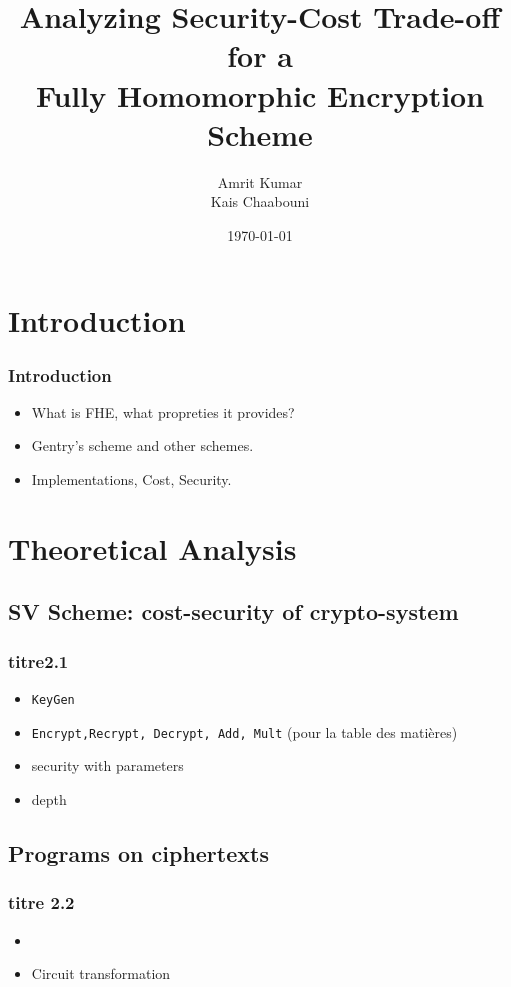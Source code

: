 \documentclass{beamer}
\title[Fully Homomorphic Encryption Scheme]{Analyzing Security-Cost Trade-off for a\\Fully Homomorphic Encryption Scheme}
\author{Amrit Kumar \\ Kais Chaabouni \\}
\date{\today}
\institute{Ensimag}
\begin{document}
\begin{frame}
  \titlepage
\end{frame}

\section{Introduction}

\begin{frame}\frametitle{Introduction}
  \begin{itemize}
  \item What is FHE, what propreties it provides?
  \item Gentry's scheme and other schemes.
  \item Implementations, Cost, Security.
  \end{itemize}
\end{frame}

\section{Theoretical Analysis}

\subsection{SV Scheme: cost-security of crypto-system}

\begin{frame} \frametitle{titre2.1}
  \begin{itemize}
  \item {\tt KeyGen}
    \pause
  \item {\tt Encrypt,Recrypt, Decrypt, Add, Mult} (pour la table des matières)

  \pause
  \item security with parameters
  \item depth
  \end{itemize}
\end{frame}

\subsection{Programs on ciphertexts}

\begin{frame} \frametitle{titre 2.2}
  \begin{itemize}
  \item {}
  \item Circuit transformation
  \end{itemize}
\end{frame}
\end{document}

